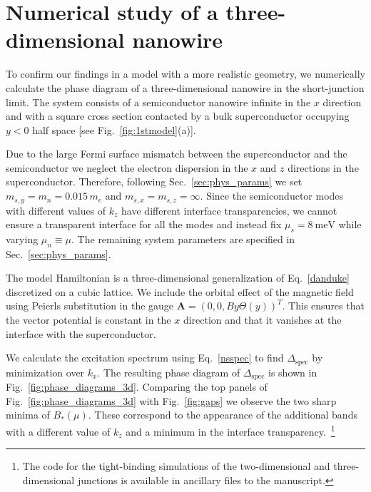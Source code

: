 \section{Numerical study of a three-dimensional nanowire}
\label{sec:3d}

To confirm our findings in a model with a more realistic geometry, we numerically calculate the phase diagram of a three-dimensional nanowire in the short-junction limit.
The system consists of a semiconductor nanowire infinite in the $x$ direction and with a square cross section contacted by a bulk superconductor occupying $y<0$ half space  [see Fig.~\ref{fig:1stmodel}(a)].

Due to the large Fermi surface mismatch between the superconductor and the semiconductor we neglect the electron dispersion in the $x$ and $z$ directions in the superconductor.
Therefore, following Sec.~\ref{sec:phys_params} we set $m_{s,y} = m_n= 0.015\, m_e$ and $m_{s,x} = m_{s, z} = \infty$.
Since the semiconductor modes with different values of $k_z$ have different interface transparencies, we cannot ensure a transparent interface for all the modes and instead fix $\mu_s=\SI{8}{\meV}$ while varying $\mu_n\equiv\mu$.
The remaining system parameters are specified in Sec.~\ref{sec:phys_params}.

The model Hamiltonian is a three-dimensional generalization of Eq.~\eqref{danduke} discretized on a cubic lattice.
We include the orbital effect of the magnetic field using Peierls substitution in the gauge $\bm A={\left( 0, 0, B y\Theta(y) \right)}^{T}$.
This ensures that the vector potential is constant in the $x$ direction and that it vanishes at the interface with the superconductor.

We calculate the excitation spectrum using Eq.~\eqref{nsspec} to find $\Delta_\mathrm{spec}$ by minimization over $k_x$.
The resulting phase diagram of $\Delta_\mathrm{spec}$ is shown in Fig.~\ref{fig:phase_diagrams_3d}.
Comparing the top panels of Fig.~\ref{fig:phase_diagrams_3d} with Fig.~\ref{fig:gaps} we observe the two sharp minima of $B_*(\mu)$.
These correspond to the appearance of the additional bands with a different value of $k_z$ and a minimum in the interface transparency.~\footnote{The code for the tight-binding simulations of the two-dimensional and three-dimensional junctions is available in ancillary files to the manuscript.}

